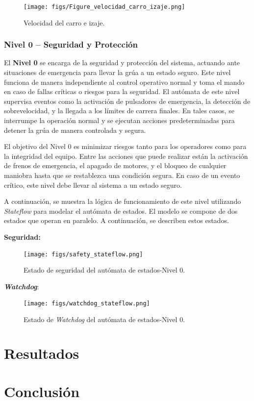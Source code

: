 \documentclass{article}
\begin{document}
            \begin{figure}[H]
                \centering
                \texttt{[image: figs/Figure\_velocidad\_carro\_izaje.png]}
                \caption{Velocidad del carro e izaje.}
                \label{fig:velocidad_carro_izaje}
            \end{figure}


            \subsubsection{Nivel 0 – Seguridad y Protección}

            El \textbf{Nivel 0} se encarga de la seguridad y protección del sistema, actuando ante situaciones de emergencia para llevar la grúa a un estado seguro. Este nivel funciona de manera independiente al control operativo normal y toma el mando en caso de fallas críticas o riesgos para la seguridad. El autómata de este nivel supervisa eventos como la activación de pulsadores de emergencia, la detección de sobrevelocidad, y la llegada a los límites de carrera finales. En tales casos, se interrumpe la operación normal y se ejecutan acciones predeterminadas para detener la grúa de manera controlada y segura.
            
            El objetivo del Nivel 0 es minimizar riesgos tanto para los operadores como para la integridad del equipo. Entre las acciones que puede realizar están la activación de frenos de emergencia, el apagado de motores, y el bloqueo de cualquier maniobra hasta que se restablezca una condición segura. En caso de un evento crítico, este nivel debe llevar al sistema a un estado seguro.

            A continuación, se muestra la lógica de funcionamiento de este nivel utilizando \textit{Stateflow} para modelar el autómata de estados. El modelo se compone de dos estados que operan en paralelo. A continuación, se describen estos estados.

            \textbf{Seguridad:}
            \begin{figure} [H]
                \centering
                \texttt{[image: figs/safety\_stateflow.png]}
                \caption{Estado de seguridad del autómata de estados-Nivel 0.}
                \label{fig:safety_stateflow}
            \end{figure}

            \textbf{\textit{Watchdog}}:
            \begin{figure} [H]
                \centering
                \texttt{[image: figs/watchdog\_stateflow.png]}
                \caption{Estado de \textit{Watchdog} del autómata de estados-Nivel 0.}
                \label{fig:watchdog_stateflow}
            \end{figure}




\section{Resultados}\label{sec:results}



\section{Conclusión}\label{sec:conclusion}


%

%
\end{document}
